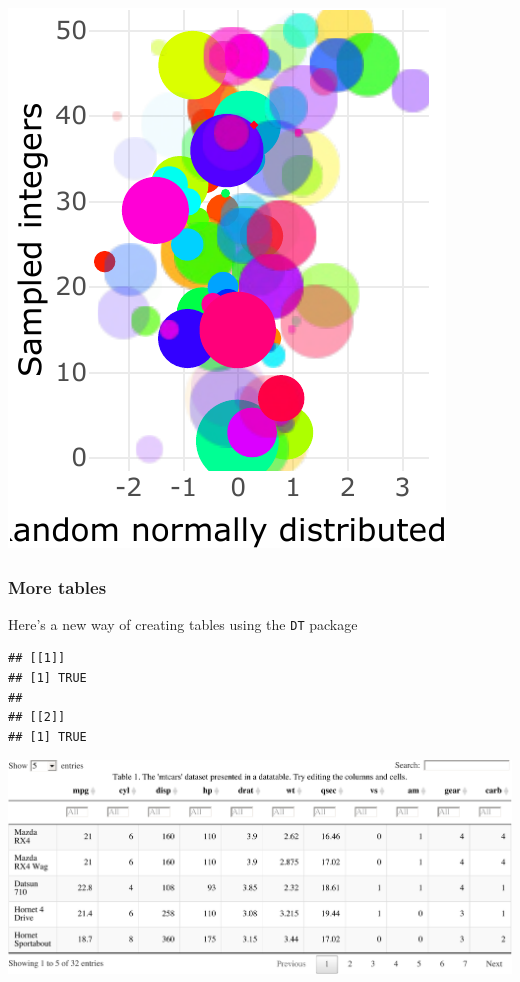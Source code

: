 \documentclass[portrait]{article}
\begin{document}
\includegraphics{Lesson5_rmd_files/figure-latex/unnamed-chunk-3-1.pdf}

\subsubsection{More tables}\label{more-tables}

Here's a new way of creating tables using the \texttt{DT} package

\begin{verbatim}
## [[1]]
## [1] TRUE
## 
## [[2]]
## [1] TRUE
\end{verbatim}

\includegraphics{Lesson5_rmd_files/figure-latex/unnamed-chunk-4-1.pdf}
\end{document}
